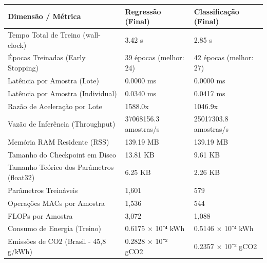 \begin{tabular}{lll}
\toprule
Dimensão / Métrica & Regressão (Final) & Classificação (Final) \\
\midrule
Tempo Total de Treino (wall-clock) & 3.42 s & 2.85 s \\
Épocas Treinadas (Early Stopping) & 39 épocas (melhor: 24) & 42 épocas (melhor: 27) \\
Latência por Amostra (Lote) & 0.0000 ms & 0.0000 ms \\
Latência por Amostra (Individual) & 0.0340 ms & 0.0417 ms \\
Razão de Aceleração por Lote & 1588.0x & 1046.9x \\
Vazão de Inferência (Throughput) & 37068156.3 amostras/s & 25017303.8 amostras/s \\
Memória RAM Residente (RSS) & 139.19 MB & 139.19 MB \\
Tamanho do Checkpoint em Disco & 13.81 KB & 9.61 KB \\
Tamanho Teórico dos Parâmetros (float32) & 6.25 KB & 2.26 KB \\
Parâmetros Treináveis & 1,601 & 579 \\
Operações MACs por Amostra & 1,536 & 544 \\
FLOPs por Amostra & 3,072 & 1,088 \\
Consumo de Energia (Treino) & 0.6175 × 10⁻⁴ kWh & 0.5146 × 10⁻⁴ kWh \\
Emissões de CO2 (Brasil - 45,8 g/kWh) & 0.2828 × 10⁻² gCO2 & 0.2357 × 10⁻² gCO2 \\
\bottomrule
\end{tabular}
